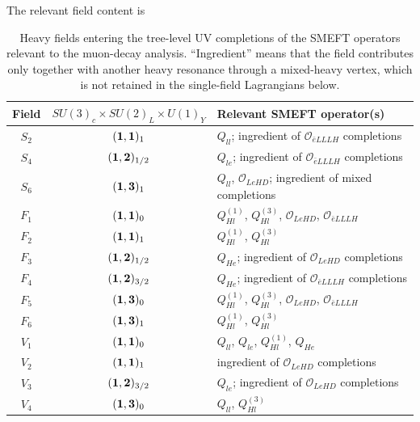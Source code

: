 The relevant field content is
\begin{table}[htbp]
    \centering
    \small
    \renewcommand{\arraystretch}{1.15}
    \begin{tabular}{ccl}
        \toprule
        Field & $SU(3)_c\times SU(2)_L\times U(1)_Y$ & Relevant SMEFT operator(s) \\
        \midrule
        $S_2$ & $({\bf1},{\bf1})_{1}$
            & $Q_{ll}$; ingredient of $\mathcal O_{\bar eLLLH}$ completions \\
        $S_4$ & $({\bf1},{\bf2})_{1/2}$
            & $Q_{le}$; ingredient of $\mathcal O_{\bar eLLLH}$ completions \\
        $S_6$ & $({\bf1},{\bf3})_{1}$
            & $Q_{ll}$, $\mathcal O_{LeHD}$; ingredient of mixed completions \\
        \midrule
        $F_1$ & $({\bf1},{\bf1})_{0}$
            & $Q_{Hl}^{(1)}$, $Q_{Hl}^{(3)}$, $\mathcal O_{LeHD}$,
              $\mathcal O_{\bar eLLLH}$ \\
        $F_2$ & $({\bf1},{\bf1})_{1}$
            & $Q_{Hl}^{(1)}$, $Q_{Hl}^{(3)}$ \\
        $F_3$ & $({\bf1},{\bf2})_{1/2}$
            & $Q_{He}$; ingredient of $\mathcal O_{LeHD}$ completions \\
        $F_4$ & $({\bf1},{\bf2})_{3/2}$
            & $Q_{He}$; ingredient of $\mathcal O_{\bar eLLLH}$ completions \\
        $F_5$ & $({\bf1},{\bf3})_{0}$
            & $Q_{Hl}^{(1)}$, $Q_{Hl}^{(3)}$, $\mathcal O_{LeHD}$,
              $\mathcal O_{\bar eLLLH}$ \\
        $F_6$ & $({\bf1},{\bf3})_{1}$
            & $Q_{Hl}^{(1)}$, $Q_{Hl}^{(3)}$ \\
        \midrule
        $V_1$ & $({\bf1},{\bf1})_{0}$
            & $Q_{ll}$, $Q_{le}$, $Q_{Hl}^{(1)}$, $Q_{He}$ \\
        $V_2$ & $({\bf1},{\bf1})_{1}$
            & ingredient of $\mathcal O_{LeHD}$ completions \\
        $V_3$ & $({\bf1},{\bf2})_{3/2}$
            & $Q_{le}$; ingredient of $\mathcal O_{LeHD}$ completions \\
        $V_4$ & $({\bf1},{\bf3})_{0}$
            & $Q_{ll}$, $Q_{Hl}^{(3)}$ \\
        \bottomrule
    \end{tabular}
    \caption{Heavy fields entering the tree-level UV completions of the
    SMEFT operators relevant to the muon-decay analysis.  ``Ingredient''
    means that the field contributes only together with another heavy
    resonance through a mixed-heavy vertex, which is not retained in the
    single-field Lagrangians below.}
    \label{tab:single-field-uv-content}
\end{table}

